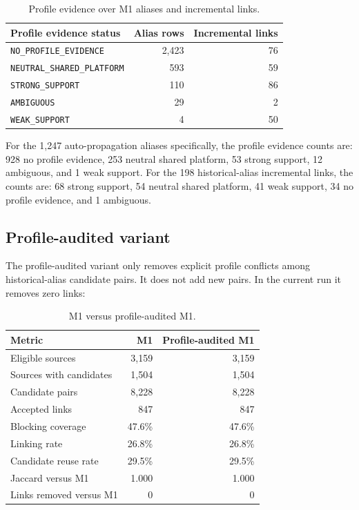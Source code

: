 \documentclass[11pt]{article}
\begin{document}
\begin{table}[h]
\centering
\caption{Profile evidence over M1 aliases and incremental links.}
\begin{tabular}{lrr}
\toprule
Profile evidence status & Alias rows & Incremental links\\
\midrule
\texttt{NO\_PROFILE\_EVIDENCE} & 2,423 & 76\\
\texttt{NEUTRAL\_SHARED\_PLATFORM} & 593 & 59\\
\texttt{STRONG\_SUPPORT} & 110 & 86\\
\texttt{AMBIGUOUS} & 29 & 2\\
\texttt{WEAK\_SUPPORT} & 4 & 50\\
\bottomrule
\end{tabular}
\end{table}

For the 1,247 auto-propagation aliases specifically, the profile evidence
counts are: 928 no profile evidence, 253 neutral shared platform, 53 strong
support, 12 ambiguous, and 1 weak support. For the 198 historical-alias
incremental links, the counts are: 68 strong support, 54 neutral shared
platform, 41 weak support, 34 no profile evidence, and 1 ambiguous.

\subsection{Profile-audited variant}

The profile-audited variant only removes explicit profile conflicts among
historical-alias candidate pairs. It does not add new pairs. In the current
run it removes zero links:

\begin{table}[h]
\centering
\caption{M1 versus profile-audited M1.}
\begin{tabular}{lrr}
\toprule
Metric & M1 & Profile-audited M1\\
\midrule
Eligible sources & 3,159 & 3,159\\
Sources with candidates & 1,504 & 1,504\\
Candidate pairs & 8,228 & 8,228\\
Accepted links & 847 & 847\\
Blocking coverage & 47.6\% & 47.6\%\\
Linking rate & 26.8\% & 26.8\%\\
Candidate reuse rate & 29.5\% & 29.5\%\\
Jaccard versus M1 & 1.000 & 1.000\\
Links removed versus M1 & 0 & 0\\
\bottomrule
\end{tabular}
\end{table}
\end{document}
